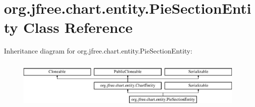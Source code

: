 \hypertarget{classorg_1_1jfree_1_1chart_1_1entity_1_1_pie_section_entity}{}\section{org.\+jfree.\+chart.\+entity.\+Pie\+Section\+Entity Class Reference}
\label{classorg_1_1jfree_1_1chart_1_1entity_1_1_pie_section_entity}
Inheritance diagram for org.\+jfree.\+chart.\+entity.\+Pie\+Section\+Entity\+:\begin{figure}[H]
\begin{center}
\leavevmode
\includegraphics[height=2.424242cm]{classorg_1_1jfree_1_1chart_1_1entity_1_1_pie_section_entity}
\end{center}
\end{figure}
